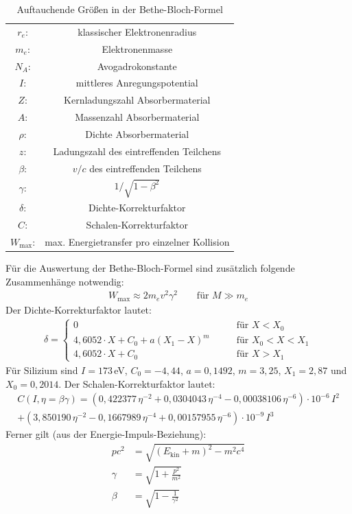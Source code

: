 \begin{table}[h]
	\centering
	\caption{Auftauchende Größen in der Bethe-Bloch-Formel}
	\begin{tabular}{cc}
		$r_e$: & klassischer Elektronenradius \\
		$m_e$: & Elektronenmasse \\
		$N_A$: & Avogadrokonstante \\
		$I$:  & mittleres Anregungspotential \\
		$Z$:  & Kernladungszahl Absorbermaterial \\
		$A$:  & Massenzahl Absorbermaterial \\
		$\rho$: & Dichte Absorbermaterial \\
		$z$:  & Ladungszahl des eintreffenden Teilchens \\
		$\beta$: & $v/c$ des eintreffenden Teilchens \\
		$\gamma$: & $1/\sqrt{1-\beta^2}$ \\
		$\delta$: & Dichte-Korrekturfaktor \\
		$C$:  & Schalen-Korrekturfaktor \\
		$W_\text{max}$: & max. Energietransfer pro einzelner Kollision \\
	\end{tabular}%
	\label{tab:bethebloch}%
\end{table}%

Für die Auswertung der Bethe-Bloch-Formel sind zusätzlich folgende Zusammenhänge notwendig:
\begin{align}
	W_\text{max}\approx 2m_ev^2\gamma^2\qquad\text{für }M\gg m_e
\end{align}
Der Dichte-Korrekturfaktor lautet:
\begin{align}
	\delta=\begin{cases}
	0 &\qquad\text{für }X<X_0\\
	4,6052\cdot X + C_0 + a(X_1-X)^m &\qquad\text{für }X_0<X<X_1\\
	4,6052\cdot X + C_0  &\qquad\text{für }X>X_1
	\end{cases}
\end{align}
Für Silizium sind $I=173\,$eV, $C_0=-4,44$, $a=0,1492$, $m=3,25$, $X_1=2,87$ und $X_0=0,2014$. Der  Schalen-Korrekturfaktor lautet:
\begin{align}
	C(I,\eta=\beta\gamma)=(0,422377\,\eta^{-2}+0,0304043\,\eta^{-4}-0,00038106\,\eta^{-6})\cdot 10^{-6}\,I^2 \nonumber\\
	+(3,850190\,\eta^{-2}-0,1667989\,\eta^{-4}+0,00157955\,\eta^{-6})\cdot 10^{-9}\,I^3
\end{align}
Ferner gilt (aus der Energie-Impuls-Beziehung):
\begin{align}
	pc^2&=\sqrt{(E_\text{kin}+m)^2-m^2c^4}\\
	\gamma &= \sqrt{1+\frac{p^2}{m^2}}\\
	\beta&=\sqrt{1-\frac{1}{\gamma^2}}
\end{align}

